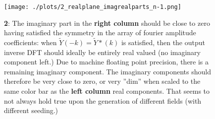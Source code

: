 \begin{figure}[h!]
  \centering
  \texttt{[image: ./plots/2\_realplane\_imagrealparts\_n-1.png]}
  \caption{\textbf{2}: The imaginary part in the \textbf{right column} should be close to zero having satisfied the symmetry in the array of fourier amplitude coefficients: when $\widetilde{Y}(-k)=\widetilde{Y}*(k)$ is satisfied, then the output inverse DFT should ideally be entirely real valued (no imaginary component left.) Due to machine floating point precision, there is a remaining imaginary component. The imaginary components should therefore be very close to zero, or very ''dim'' when scaled to the same color bar as the \textbf{left column} real components. That seems to not always hold true upon the generation of different fields (with different seeding.)}
  \label{fig:imagrealparts}
\end{figure}


